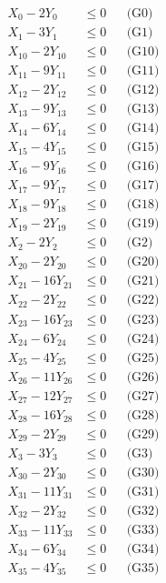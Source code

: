 \documentclass[a4paper,10pt]{article}
\begin{document}
\allowdisplaybreaks
{\small\begin{align}
X_{0} - 2Y_{0} &\leq 0 && \text{(G0)} \\
X_{1} - 3Y_{1} &\leq 0 && \text{(G1)} \\
X_{10} - 2Y_{10} &\leq 0 && \text{(G10)} \\
X_{11} - 9Y_{11} &\leq 0 && \text{(G11)} \\
X_{12} - 2Y_{12} &\leq 0 && \text{(G12)} \\
X_{13} - 9Y_{13} &\leq 0 && \text{(G13)} \\
X_{14} - 6Y_{14} &\leq 0 && \text{(G14)} \\
X_{15} - 4Y_{15} &\leq 0 && \text{(G15)} \\
X_{16} - 9Y_{16} &\leq 0 && \text{(G16)} \\
X_{17} - 9Y_{17} &\leq 0 && \text{(G17)} \\
X_{18} - 9Y_{18} &\leq 0 && \text{(G18)} \\
X_{19} - 2Y_{19} &\leq 0 && \text{(G19)} \\
X_{2} - 2Y_{2} &\leq 0 && \text{(G2)} \\
X_{20} - 2Y_{20} &\leq 0 && \text{(G20)} \\
X_{21} - 16Y_{21} &\leq 0 && \text{(G21)} \\
X_{22} - 2Y_{22} &\leq 0 && \text{(G22)} \\
X_{23} - 16Y_{23} &\leq 0 && \text{(G23)} \\
X_{24} - 6Y_{24} &\leq 0 && \text{(G24)} \\
X_{25} - 4Y_{25} &\leq 0 && \text{(G25)} \\
X_{26} - 11Y_{26} &\leq 0 && \text{(G26)} \\
\allowbreak
X_{27} - 12Y_{27} &\leq 0 && \text{(G27)} \\
X_{28} - 16Y_{28} &\leq 0 && \text{(G28)} \\
X_{29} - 2Y_{29} &\leq 0 && \text{(G29)} \\
X_{3} - 3Y_{3} &\leq 0 && \text{(G3)} \\
X_{30} - 2Y_{30} &\leq 0 && \text{(G30)} \\
X_{31} - 11Y_{31} &\leq 0 && \text{(G31)} \\
X_{32} - 2Y_{32} &\leq 0 && \text{(G32)} \\
X_{33} - 11Y_{33} &\leq 0 && \text{(G33)} \\
X_{34} - 6Y_{34} &\leq 0 && \text{(G34)} \\
X_{35} - 4Y_{35} &\leq 0 && \text{(G35)} \\

\end{align}}
\end{document}
